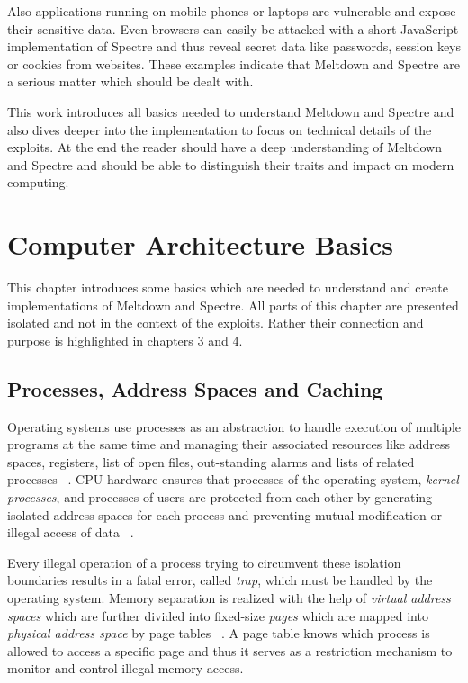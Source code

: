 \documentclass[a4paper,oneside,openright] {scrreprt}
\begin{document}
Also applications running on mobile phones or laptops are vulnerable and expose their sensitive data. 
Even browsers can easily be attacked with a short JavaScript implementation of Spectre and thus reveal secret data
like passwords, session keys or cookies from websites. These examples indicate that Meltdown and Spectre are a serious matter which should be dealt with.

This work introduces all basics needed to understand Meltdown and Spectre and also dives deeper into the implementation
to focus on technical details of the exploits. At the end the reader should have a deep understanding of Meltdown and Spectre
and should be able to distinguish their traits and impact on modern computing.

\chapter{Computer Architecture Basics}
\label{ch:basics}

This chapter introduces some basics which are needed to understand and create implementations of Meltdown and Spectre. 
All parts of this chapter are presented isolated and not in the context of the exploits. 
Rather their connection and purpose is highlighted in chapters 3 and 4.

\section{Processes, Address Spaces and Caching}
\label{ch:intro:motivation}

Operating systems use processes as an abstraction to handle execution of multiple programs at the same time
 and managing their associated resources like address spaces, registers, list of open files, 
 out-standing alarms and lists of related processes ~\cite{tanenbaum2009modern:39-41}. 
CPU hardware ensures that processes of the operating system, \textit{kernel processes},  and processes of users are protected from each other 
by generating isolated address spaces for each process 
and preventing mutual modification or illegal access of data ~\cite{silberschatz2012operating}.

Every illegal operation of a process trying to circumvent these isolation boundaries results in a 
fatal error, called \textit{trap}, which must be handled by the operating system. Memory separation is realized 
with the help of \textit{virtual address spaces} which are further divided into fixed-size \textit{pages} 
which are mapped into \textit{physical address space} by page tables ~\cite{hennessy2011computer:105-107}. 
A page table knows which process is allowed to access a specific page and thus it serves as
 a restriction mechanism to monitor and control illegal memory access.
\end{document}
